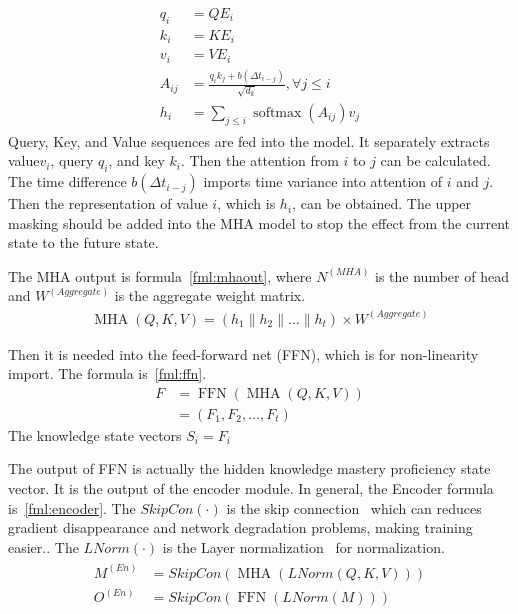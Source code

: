 \begin{align}\label{fml:mha}
	\begin{split}
		q_{i}   & =Q E_i                                                                \\
		k_{i}   & =K E_i                                                                \\
		v_{i}   & =V E_i                                                                \\
		A_{i j} & =\frac{q_{i} k_{j}+b(\Delta t_{i-j})}{\sqrt{d_{k}}}, \forall j \leq i \\
		h_{i}   & =\sum_{j \leq i} \operatorname{softmax}(A_{i j}) v_{j}
	\end{split}
\end{align}
Query, Key, and Value sequences are fed into the model. It separately extracts  value\(v_i\), query \(q_i\), and key \(k_i\). Then the attention from \(i\) to \(j\) can be calculated. The time difference \(b(\Delta t_{i-j})\) imports time variance into attention of \(i\) and \(j\). Then the representation of value \(i\), which is \(h_i\), can be obtained. The upper masking should be added into the MHA model to stop the effect from the current state to the future state.

The MHA output is formula~\ref{fml:mhaout}, where \(N^{(MHA)}\) is the number of head and \(W^{(Aggregate)}\) is the aggregate weight matrix.
\begin{align}
	\operatorname{MHA}(Q,K,V) = (h_1\|h_2\|\ldots \|h_t) \times W^{(Aggregate)}\label{fml:mhaout}
\end{align}

Then it is needed into the feed-forward net (FFN), which is for non-linearity import. The formula is~\ref{fml:ffn}.
\begin{align}\label{fml:ffn}
	F & = \operatorname{FFN}(\operatorname{MHA}(Q,K,V)) \\&=(F_1,F_2,\ldots,F_t)
\end{align}
The knowledge state vectors \(S_i = F_i\)

The output of FFN is actually the hidden knowledge mastery proficiency state vector. It is the output of the encoder module. In general, the Encoder formula is~\ref{fml:encoder}. The \(SkipCon(\cdot)\) is the skip connection~\cite{he2016deep} which can reduces gradient disappearance and network degradation problems, making training easier.. The \(LNorm(\cdot)\) is the Layer normalization~\cite{ba2016layer}
for normalization.
\begin{align}\label{fml:encoder}
	\begin{split}
		M^{(En)} & =SkipCon(\operatorname{MHA}(LNorm(Q,K,V))) \\
		O^{(En)} & =SkipCon(\operatorname{FFN}(LNorm(M)))
	\end{split}
\end{align}

